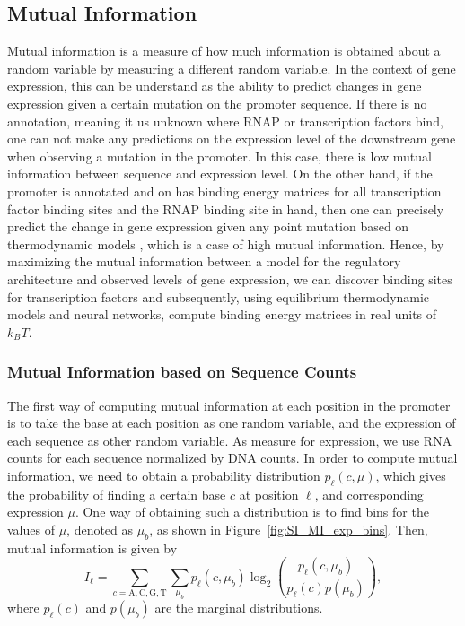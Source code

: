 \subsection{Mutual Information}
Mutual information is a measure of how much information is obtained about a random variable by measuring a different random variable. In the context of gene expression, this can be understand as the ability to predict changes in gene expression given a certain mutation on the promoter sequence. If there is no annotation, meaning it us unknown where RNAP or transcription factors bind, one can not make any predictions on the expression level of the downstream gene when observing a mutation in the promoter. In this case, there is low mutual information between sequence and expression level. On the other hand, if the promoter is annotated and on has binding energy matrices for all transcription factor binding sites and the RNAP binding site in hand, then one can precisely predict the change in gene expression given any point mutation based on thermodynamic models , which is a case of high mutual information. Hence, by maximizing the mutual information between a model for the regulatory architecture and observed levels of gene expression, we can discover binding sites for transcription factors and subsequently, using equilibrium thermodynamic models and neural networks, compute binding energy matrices in real units of $k_BT$.

\subsubsection{Mutual Information based on Sequence Counts}
The first way of computing mutual information at each position in the promoter is to take the base at each position as one random variable, and the expression of each sequence as other random variable. As measure for expression, we use RNA counts for each sequence normalized by DNA counts. In order to compute mutual information, we need to obtain a probability distribution $p_\ell(c, \mu)$, which gives the probability of finding a certain base $c$ at position $\ell$, and corresponding expression $\mu$. One way of obtaining such a distribution is to find bins for the values of $\mu$, denoted as $\mu_b$, as shown in Figure~\ref{fig:SI_MI_exp_bins}. Then, mutual information is given by
\begin{equation}
    I_\ell = \sum_{c=\mathrm{A,C,G,T}} \sum_{\mu_b}p_{\ell}(c, \mu_b)\log_2\left(\frac{p_{\ell}(c, \mu_b)}{p_{\ell}(c)p(\mu_b)}\right),
\end{equation}
where $p_{\ell}(c)$ and $p(\mu_b)$ are the marginal distributions.





